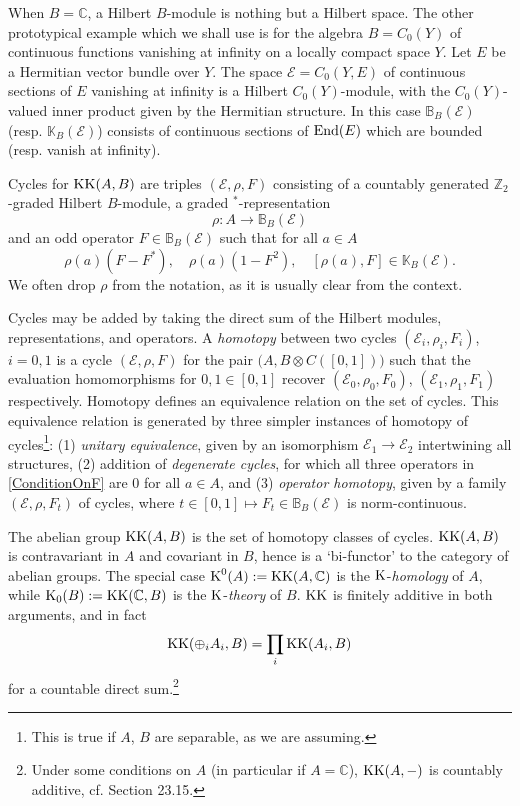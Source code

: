 \documentclass[11pt,reqno]{amsart}
\theoremstyle{definition}
\theoremstyle{remark}
\def\E{\ensuremath{\mathcal{E}}}
\def\K{\ensuremath{\mathcal{K}}}
\def\bC{\ensuremath{\mathbb{C}}}
\def\bZ{\ensuremath{\mathbb{Z}}}
\def\bB{\ensuremath{\mathbb{B}}}
\def\bK{\ensuremath{\mathbb{K}}}
\def\End{\ensuremath{\textnormal{End}}}
\def\KK{\ensuremath{\textnormal{KK}}}
\def\K{\ensuremath{\textnormal{K}}}
\begin{document}
When $B=\bC$, a Hilbert $B$-module is nothing but a Hilbert space.  The other prototypical example which we shall use is for the algebra $B=C_0(Y)$ of continuous functions vanishing at infinity on a locally compact space $Y$.  Let $E$ be a Hermitian vector bundle over $Y$.  The space $\E=C_0(Y,E)$ of continuous sections of $E$ vanishing at infinity is a Hilbert $C_0(Y)$-module, with the $C_0(Y)$-valued inner product given by the Hermitian structure.  In this case $\bB_B(\E)$ (resp. $\bK_B(\E)$) consists of continuous sections of $\End(E)$ which are bounded (resp. vanish at infinity).

Cycles for $\KK(A,B)$ are triples $(\E,\rho,F)$ consisting of a countably generated $\bZ_2$-graded Hilbert $B$-module, a graded $^\ast$-representation 
\[ \rho \colon A \rightarrow \bB_B(\E) \]
and an odd operator $F \in \bB_B(\E)$ such that for all $a \in A$
\begin{equation}
\label{ConditionOnF} 
\rho(a)(F-F^\ast), \quad \rho(a)(1-F^2), \quad [\rho(a),F] \in \bK_B(\E). 
\end{equation}
We often drop $\rho$ from the notation, as it is usually clear from the context.  

Cycles may be added by taking the direct sum of the Hilbert modules, representations, and operators.  A \emph{homotopy} between two cycles $(\E_i,\rho_i,F_i)$, $i=0,1$ is a cycle $(\E,\rho,F)$ for the pair $\big(A,B \otimes C([0,1])\big)$ such that the evaluation homomorphisms for $0,1 \in [0,1]$ recover $(\E_0,\rho_0,F_0)$, $(\E_1,\rho_1,F_1)$ respectively.  Homotopy defines an equivalence relation on the set of cycles.  This equivalence relation is generated by three simpler instances of homotopy of cycles\footnote{This is true if $A$, $B$ are separable, as we are assuming.}: (1) \emph{unitary equivalence}, given by an isomorphism $\E_1 \rightarrow \E_2$ intertwining all structures, (2) addition of \emph{degenerate cycles}, for which all three operators in \eqref{ConditionOnF} are $0$ for all $a \in A$, and (3) \emph{operator homotopy}, given by a family $(\E,\rho,F_t)$ of cycles, where $t \in [0,1] \mapsto F_t \in \bB_B(\E)$ is norm-continuous.

The abelian group $\KK(A,B)$ is the set of homotopy classes of cycles.  $\KK(A,B)$ is contravariant in $A$ and covariant in $B$, hence is a `bi-functor' to the category of abelian groups.  The special case $\K^0(A):=\KK(A,\bC)$ is the $\K$-\emph{homology} of $A$, while $\K_0(B):=\KK(\bC,B)$ is the $\K$-\emph{theory} of $B$.  $\KK$ is finitely additive in both arguments, and in fact
\begin{equation} 
\label{eqn:KHomologyAdditivity}
\KK(\oplus_i A_i,B)=\prod_i \KK(A_i,B) 
\end{equation}
for a countable direct sum.\footnote{Under some conditions on $A$ (in particular if $A=\bC$), $\KK(A,-)$ is countably additive, cf. \cite{Blackadar} Section 23.15.}
\end{document}
